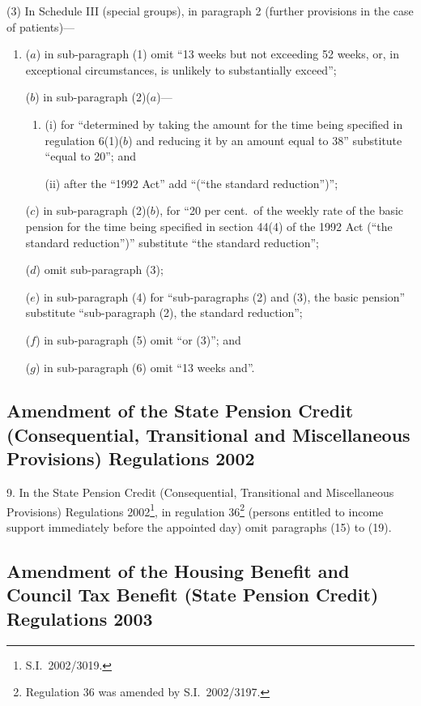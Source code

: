 \documentclass[12pt,a4paper]{article}
\begin{document}
(3) In Schedule III (special groups), in paragraph 2 (further provisions in the case of patients)—
\begin{enumerate}\item[]
($a$) in sub-paragraph (1) omit “13 weeks but not exceeding 52 weeks, or, in exceptional circumstances, is unlikely to substantially exceed”;

($b$) in sub-paragraph (2)($a$)—
\begin{enumerate}\item[]
(i) for “determined by taking the amount for the time being specified in regulation 6(1)($b$)  and reducing it by an amount equal to 38” substitute “equal to 20”; and

(ii) after the “1992 Act” add “(“the standard reduction”)”;
\end{enumerate}

($c$) in sub-paragraph (2)($b$), for “20 per cent.\ of the weekly rate of the basic pension for the time being specified in section 44(4) of the 1992 Act (“the standard reduction”)” substitute “the standard reduction”;

($d$) omit sub-paragraph (3);

($e$) in sub-paragraph (4) for “sub-paragraphs (2) and (3), the basic pension” substitute “sub-paragraph (2), the standard reduction”;

($f$) in sub-paragraph (5) omit “or (3)”; and

($g$) in sub-paragraph (6) omit “13 weeks and”.
\end{enumerate}

\subsection[9. Amendment of the State Pension Credit (Consequential, Transitional and Miscellaneous Provisions) Regulations 2002]{Amendment of the State Pension Credit (Consequential, Transitional and Miscellaneous Provisions) Regulations 2002}

9.  In the State Pension Credit (Consequential, Transitional and Miscellaneous Provisions) Regulations 2002\footnote{S.I.\ 2002/3019.}, in regulation 36\footnote{Regulation 36 was amended by S.I.\ 2002/3197.} (persons entitled to income support immediately before the appointed day) omit paragraphs (15) to (19).

\subsection[10. Amendment of the Housing Benefit and Council Tax Benefit (State Pension Credit) Regulations 2003]{Amendment of the Housing Benefit and Council Tax Benefit (State Pension Credit) Regulations 2003}
\end{document}
